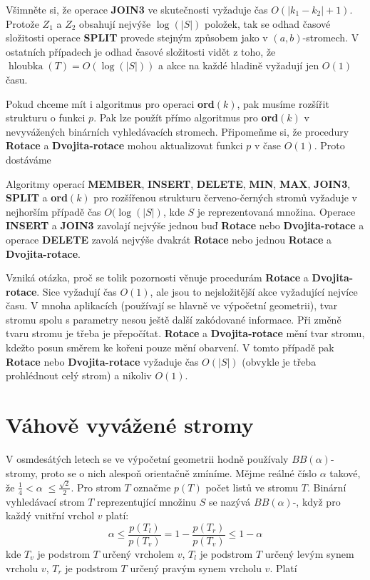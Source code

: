 \documentclass[a4paper,12pt]{article}
\def \emph#1{\underbar{#1}}
\DeclareMathOperator*{\hloubka}{hloubka}
\begin{document}
Všimněte si, že operace {\bf JOIN3} ve skutečnosti 
vyžaduje čas $O(|k_1-k_2|+1)$. Protože $Z_1$ a $Z_2$ obsahují nejvýše 
$\log(|S|)$ položek, tak se odhad časové složitosti operace {\bf SPLIT }
prove\-de stejným způsobem jako v $(a,b)$-stromech. 
V ostatních pří\-pa\-dech je odhad časové složitosti vidět z toho, 
že $\hloubka(T)=O(\log(|S|))$ a akce na každé hladině vyžadují jen 
$O(1)$ času.

Pokud chceme mít i algoritmus pro operaci {\bf ord$
(k)$}, pak 
musíme rozšířit strukturu o funkci $p$. Pak lze použít přímo 
algoritmus pro {\bf ord$(k)$} v nevyvážených binárních vyhledávacích 
stromech. Připomeňme si, že procedury {\bf Rotace} a {\bf Dvojita-rotace }
mohou aktualizovat funkci $p$ v čase $O(1)$. Proto dostáváme 

\begin{veta}Algoritmy operací {\bf MEMBER}, 
{\bf INSERT}, {\bf DE\-LE\-TE}, {\bf MIN}, {\bf MAX}, {\bf JOIN3}, {\bf SPLIT} a {\bf ord$
(k)$} pro 
roz\-ší\-ře\-nou strukturu červeno-černých stromů vyžaduje 
v nejhorším případě čas $O(\log(|S|)$, kde $S$ je reprezentovaná 
množina.  Operace {\bf INSERT} a {\bf JOIN3} zavolají nejvýše jednou buď 
{\bf Rotace} nebo {\bf Dvojita-rota\-ce} a operace {\bf DELETE} zavolá nejvýše 
dvakrát {\bf Rotace} nebo jednou {\bf Rotace} a {\bf Dvojita-rotace}.  \end{veta}

Vzniká otázka, proč se tolik pozornosti věnuje 
procedurám {\bf Rotace} a {\bf Dvojita-rotace}. Sice vyžadují čas 
$O(1)$, ale jsou to nej\-složitější akce vyžadující nejvíce času. 
V mnoha aplikacích (pou\-žívají se hlavně ve výpočetní geometrii), 
tvar stromu spolu s parametry nesou ještě 
další zakódované informace. Při změně tvaru stromu je 
třeba je přepočítat. {\bf Rotace} a {\bf Dvojita-rotace} mění tvar 
stromu, kdežto posun směrem ke kořeni pouze mění 
obarvení. V tomto případě pak {\bf Rotace} nebo {\bf Dvo\-ji\-ta-rotace }
vyžaduje čas $O(|S|)$ (obvykle je třeba prohlédnout celý 
strom) a nikoliv $O(1)$.

\section{Váhově vyvážené stromy}

V osmdesátých letech se ve výpočetní geometrii 
hodně použí\-va\-ly $BB(\alpha )$-stromy, proto se o nich alespoň 
orientačně zmíníme. Mějme reálné číslo $
\alpha$ takové, že 
$\frac 14<\alpha\;\le\frac {\sqrt 2}2$. Pro strom $T$ označme $
p(T)$ počet 
listů ve stromu $T$. Binární vyhledávací strom $T$ 
reprezentující množinu $S$ se nazývá $BB(\alpha )$-\emph{strom}, 
když pro každý vnitřní vrchol $v$ platí:
$$\alpha\le\frac {p(T_l)}{p (T_v)}=1-\frac {p(T_r)}{p(T_v)}\le 1-\alpha$$
kde $T_v$ je podstrom $T$ určený vrcholem $v$, $T_l$ je podstrom 
$T$ určený levým synem vrcholu $v$, $T_r$ je podstrom $T$ 
určený pravým synem vrcholu $v$. Platí
\end{document}
